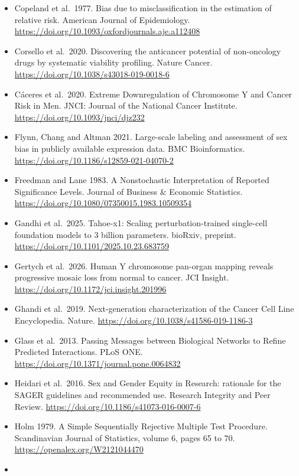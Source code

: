 \documentclass[
  11pt,
  letterpaper,
]{article}
\begin{document}
\begin{itemize}
  cells impacts outcome. Nature.
  \url{https://doi.org/10.1038/s41586-025-09071-2}
\item
  Copeland et al.~1977. Bias due to misclassification in the estimation
  of relative risk. American Journal of Epidemiology.
  \url{https://doi.org/10.1093/oxfordjournals.aje.a112408}
\item
  Corsello et al.~2020. Discovering the anticancer potential of
  non-oncology drugs by systematic viability profiling. Nature Cancer.
  \url{https://doi.org/10.1038/s43018-019-0018-6}
\item
  Cáceres et al.~2020. Extreme Downregulation of Chromosome Y and Cancer
  Risk in Men. JNCI: Journal of the National Cancer Institute.
  \url{https://doi.org/10.1093/jnci/djz232}
\item
  Flynn, Chang and Altman 2021. Large-scale labeling and assessment of
  sex bias in publicly available expression data. BMC Bioinformatics.
  \url{https://doi.org/10.1186/s12859-021-04070-2}
\item
  Freedman and Lane 1983. A Nonstochastic Interpretation of Reported
  Significance Levels. Journal of Business \& Economic Statistics.
  \url{https://doi.org/10.1080/07350015.1983.10509354}
\item
  Gandhi et al.~2025. Tahoe-x1: Scaling perturbation-trained single-cell
  foundation models to 3 billion parameters. bioRxiv, preprint.
  \url{https://doi.org/10.1101/2025.10.23.683759}
\item
  Gertych et al.~2026. Human Y chromosome pan-organ mapping reveals
  progressive mosaic loss from normal to cancer. JCI Insight.
  \url{https://doi.org/10.1172/jci.insight.201996}
\item
  Ghandi et al.~2019. Next-generation characterization of the Cancer
  Cell Line Encyclopedia. Nature.
  \url{https://doi.org/10.1038/s41586-019-1186-3}
\item
  Glass et al.~2013. Passing Messages between Biological Networks to
  Refine Predicted Interactions. PLoS ONE.
  \url{https://doi.org/10.1371/journal.pone.0064832}
\item
  Heidari et al.~2016. Sex and Gender Equity in Research: rationale for
  the SAGER guidelines and recommended use. Research Integrity and Peer
  Review. \url{https://doi.org/10.1186/s41073-016-0007-6}
\item
  Holm 1979. A Simple Sequentially Rejective Multiple Test Procedure.
  Scandinavian Journal of Statistics, volume 6, pages 65 to 70.
  \url{https://openalex.org/W2121044470}
\item

\end{itemize}
\end{document}
